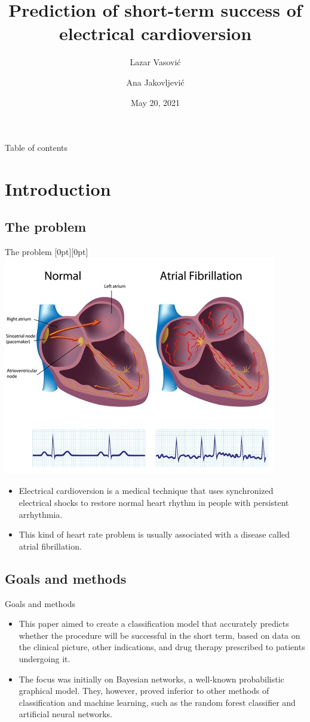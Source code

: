 \documentclass[hyperref={bookmarks=false}]{beamer}
\title[Electrical cardioversion]{Prediction of short-term success of electrical cardioversion}
\author{Lazar Vasović \and Ana Jakovljević}
\institute[]{Faculty of Mathematics, University of Belgrade\\\url{https://github.com/matfija/Elektrokonverzija}}
\date[Faculty of Mathematics]{May 20, 2021}
\newcommand{\lenitem}[2][.51\linewidth]{\parbox[t]{#1}{\strut #2\strut}}
\begin{document}
\frame{\titlepage}

\begin{frame}{Table of contents}
\tableofcontents[subsectionstyle=hide]
\end{frame}

\section{Introduction}
\subsection{The problem}
\begin{frame}{The problem}
\mbox{}\hfill\raisebox{-\height}[0pt][0pt]{\includegraphics[width=.42\linewidth]{../slike/fibrillation.jpg}}
\vspace*{-\baselineskip}

\begin{itemize}
    \item \lenitem{Electrical cardioversion is a medical technique that uses synchronized electrical shocks to restore normal heart rhythm in people with persistent arrhythmia.}

    \item \lenitem{This kind of heart rate problem is usually associated with a disease called atrial fibrillation.}
\end{itemize}
\end{frame}

\subsection{Goals and methods}
\begin{frame}{Goals and methods}
\begin{itemize}
    \item This paper aimed to create a classification model that accurately predicts whether the procedure will be successful in the short term, based on data on the clinical picture, other indications, and drug therapy prescribed to patients undergoing it.

    \item The focus was initially on Bayesian networks, a well-known probabilistic graphical model. They, however, proved inferior to other methods of classification and machine learning, such as the random forest classifier and artificial neural networks.
\end{itemize}
\end{frame}
\end{document}
